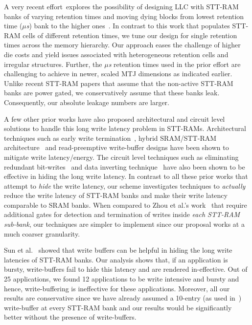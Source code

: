 A very recent effort~\cite{multi-level-retention}explores the possibility of designing LLC 
with STT-RAM banks of varying retention times and moving dying blocks 
from lowest retention time ({\it $\mu$s}) bank to the higher 
ones~\cite{multi-level-retention}. In contrast to this work that 
populates STT-RAM cells of different retention times, we tune our design 
for single retention times across the memory hierarchy. Our approach 
eases the challenge of higher die costs and yield issues associated with 
heterogeneous retention cells and irregular structures. Further, the {\it $\mu$s}
retention times used in the prior effort are challenging to achieve in 
newer, scaled MTJ dimensions as indicated earlier. Unlike recent STT-RAM papers 
that assume that the non-active STT-RAM banks are power gated, we conservatively assume that
these banks leak. Consequently, our absolute leakage numbers are larger.

A few other prior works have also proposed architectural and circuit level
solutions to handle this long write latency problem in STT-RAMs. Architectural techniques such as
early write termination~\cite{mram-energy-reduction}, hybrid SRAM/STT-RAM
architecture~\cite{gsun-hpca, Qureshi:2009:SHPMM} and read-preemptive write-buffer designs have been
shown to mitigate write latency/energy. The circuit level techniques such as eliminating redundant
bit-writes~\cite{mram-energy-reduction} and data inverting technique~\cite{gsun-hpca} have also been
shown to be effective in hiding the long write latency. In contrast to all these prior works that
attempt to {\it hide} the write latency, our scheme investigates techniques to {\it actually} reduce
the write latency of STT-RAM banks and make their write latency comparable to SRAM banks. When
compared to Zhou et al.'s work~\cite{mram-energy-reduction} that require additional gates for
detection and termination of writes inside {\it each STT-RAM sub-bank}, our techniques are simpler to
implement since our proposal works at a much coarser granularity.

Sun et al.~\cite{gsun-hpca} showed that write buffers can be helpful in hiding the long write
latencies of STT-RAM banks. Our analysis shows that, if an application is bursty, write-buffers fail
to hide this latency and are rendered in-effective. Out of 25 applications, we found 12 applications
to be write intensive and bursty and hence, write-buffering is ineffective for these applications.
Moreover, all our results are conservative since we have already assumed a 10-entry (as used
in~\cite{gsun-hpca}) write-buffer at every STT-RAM bank and our results would be significantly better
without the presence of write-buffers.

